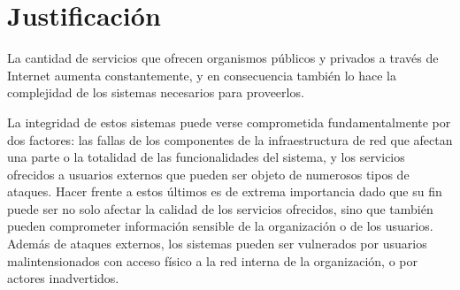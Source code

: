 \section*{Justificación}
La cantidad de servicios que ofrecen organismos públicos y privados a través de Internet aumenta constantemente, y en consecuencia también lo hace la complejidad de los sistemas necesarios para proveerlos. \par
La integridad de estos sistemas puede verse comprometida fundamentalmente por dos factores: las fallas de los componentes de la infraestructura de red\cite{Gill:2011:UNF:2043164.2018477} que afectan una parte o la totalidad de las funcionalidades del sistema, y los servicios ofrecidos a usuarios externos que pueden ser objeto de numerosos tipos de ataques\cite{Karumanchi:2014:WLS:2554850.2555010}\cite{mutchler15:mobilewebapps}. Hacer frente a estos últimos es de extrema importancia dado que su fin puede ser no solo afectar la calidad de los servicios ofrecidos, sino que también pueden comprometer información sensible de la organización o de los usuarios. Además de ataques externos, los sistemas pueden ser vulnerados por usuarios malintensionados con acceso físico a la red interna de la organización, o por actores inadvertidos\cite{Kraemer2007143}\cite{Kraemer2009509}\cite{Liginlal2009215}\cite{Ahmed12humanerrors}. \par
